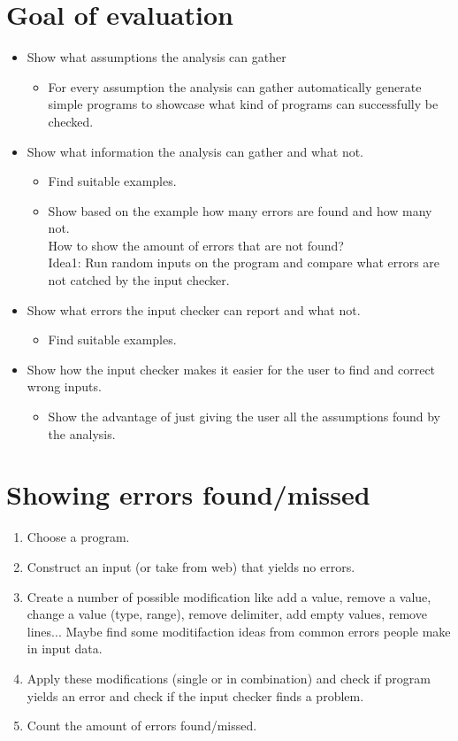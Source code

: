 \documentclass[11pt]{article}
\begin{document}
\section{Goal of evaluation}

\begin{itemize}
  \item Show what assumptions the analysis can gather
  \begin{itemize}
    \item For every assumption the analysis can gather automatically generate simple programs to showcase what kind of programs can successfully be checked.
  \end{itemize}
  \item Show what information the analysis can gather and what not.
  \begin{itemize}
    \item Find suitable examples.
    \item Show based on the example how many errors are found and how many not.\\
    How to show the amount of errors that are not found?\\
    Idea1: Run random inputs on the program and compare what errors are not catched by the input checker.
  \end{itemize}
  \item Show what errors the input checker can report and what not.
  \begin{itemize}
    \item Find suitable examples.
  \end{itemize}
  \item Show how the input checker makes it easier for the user to find and correct wrong inputs.
  \begin{itemize}
    \item Show the advantage of just giving the user all the assumptions found by the analysis.
  \end{itemize}
\end{itemize}


\section{Showing errors found/missed}

\begin{enumerate}
  \item Choose a program.
  \item Construct an input (or take from web) that yields no errors.
  \item Create a number of possible modification like add a value, remove a value, change a value (type, range), remove delimiter, add empty values, remove lines... Maybe find some moditifaction ideas from common errors people make in input data.
  \item Apply these modifications (single or in combination) and check if program yields an error and check if the input checker finds a problem.
  \item Count the amount of errors found/missed.
\end{enumerate}
\end{document}
